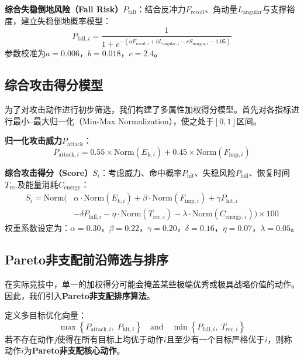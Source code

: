 \documentclass[a4paper,12pt]{article}
\numberwithin{equation}{section}
\numberwithin{table}{section}
\numberwithin{figure}{section}
\begin{document}
\textbf{综合失稳倒地风险（Fall Risk）}$P_{\text{fall}}$：结合反冲力$F_{\text{recoil}}$、角动量$L_{\text{angular}}$与支撑裕度，建立失稳倒地概率模型：
\begin{equation}
    P_{\text{fall}, i} = \frac{1}{1 + e^{-\left(a F_{\text{recoil}, i} + b L_{\text{angular}, i} - c S_{\text{margin}, i} - 1.05\right)}}
    \label{eq:pfall}
\end{equation}
参数校准为$a = 0.006$，$b = 0.018$，$c = 2.4$。

\subsection{综合攻击得分模型}

为了对攻击动作进行初步筛选，我们构建了多属性加权得分模型。首先对各指标进行最小--最大归一化（Min-Max Normalization），使之处于$[0, 1]$区间。

\textbf{归一化攻击威力}$P_{\text{attack}}$：
\begin{equation}
    P_{\text{attack}, i} = 0.55 \times \text{Norm}(E_{k, i}) + 0.45 \times \text{Norm}(F_{\text{imp}, i})
    \label{eq:pattack}
\end{equation}

\textbf{综合攻击得分（Score）}$S_i$：考虑威力、命中概率$P_{\text{hit}}$、失稳风险$P_{\text{fall}}$、恢复时间$T_{\text{rec}}$及能量消耗$C_{\text{energy}}$：
\begin{equation}
    \begin{aligned}
        S_i = \text{Norm}\Big(&\alpha \cdot \text{Norm}(E_{k, i}) + \beta \cdot \text{Norm}(F_{\text{imp}, i}) + \gamma P_{\text{hit}, i} \\
        &- \delta P_{\text{fall}, i} - \eta \cdot \text{Norm}(T_{\text{rec}, i}) - \lambda \cdot \text{Norm}(C_{\text{energy}, i})\Big) \times 100
    \end{aligned}
    \label{eq:score}
\end{equation}
权重系数设定为：$\alpha = 0.30$，$\beta = 0.22$，$\gamma = 0.20$，$\delta = 0.16$，$\eta = 0.07$，$\lambda = 0.05$。

\subsection{Pareto非支配前沿筛选与排序}

在实际竞技中，单一的加权得分可能会掩盖某些极端优秀或极具战略价值的动作。因此，我们引入\textbf{Pareto非支配排序算法}。

定义多目标优化向量：
\begin{equation}
    \max\left\{P_{\text{attack}, i},\; P_{\text{hit}, i}\right\} \quad \text{and} \quad \min\left\{P_{\text{fall}, i},\; T_{\text{rec}, i}\right\}
    \label{eq:pareto_obj}
\end{equation}
若不存在动作$j$使得在所有目标上均优于动作$i$且至少有一个目标严格优于$i$，则称动作$i$为\textbf{Pareto非支配核心动作}。
\end{document}
